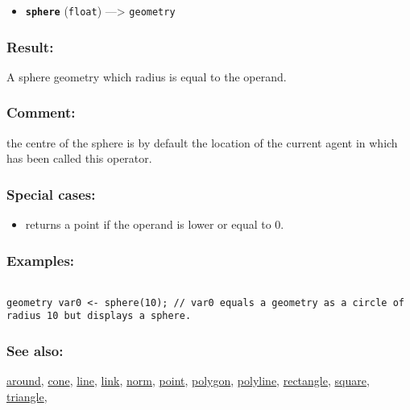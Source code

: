 \documentclass[]{book}
\providecommand{\tightlist}{%
  \setlength{\itemsep}{0pt}\setlength{\parskip}{0pt}}
\theoremstyle{definition}
\theoremstyle{definition}
\theoremstyle{definition}
\theoremstyle{remark}
\begin{document}
\begin{itemize}
\tightlist
\item
  \textbf{\texttt{sphere}} (\texttt{float}) ---\textgreater{}
  \texttt{geometry}
\end{itemize}

\subsubsection{Result:}\label{result-474}

A sphere geometry which radius is equal to the operand.

\subsubsection{Comment:}\label{comment-90}

the centre of the sphere is by default the location of the current agent
in which has been called this operator.

\subsubsection{Special cases:}\label{special-cases-127}

\begin{itemize}
\tightlist
\item
  returns a point if the operand is lower or equal to 0.
\end{itemize}

\subsubsection{Examples:}\label{examples-342}

\begin{verbatim}
 
geometry var0 <- sphere(10); // var0 equals a geometry as a circle of radius 10 but displays a sphere.
\end{verbatim}

\subsubsection{See also:}\label{see-also-191}

\href{OperatorsAA\#around}{around}, \href{OperatorsBC\#cone}{cone},
\href{OperatorsIM\#line}{line}, \href{OperatorsIM\#link}{link},
\href{OperatorsNR\#norm}{norm}, \href{OperatorsNR\#point}{point},
\href{OperatorsNR\#polygon}{polygon},
\href{OperatorsNR\#polyline}{polyline},
\href{OperatorsNR\#rectangle}{rectangle},
\href{OperatorsSZ\#square}{square},
\href{OperatorsSZ\#triangle}{triangle},
\end{document}
